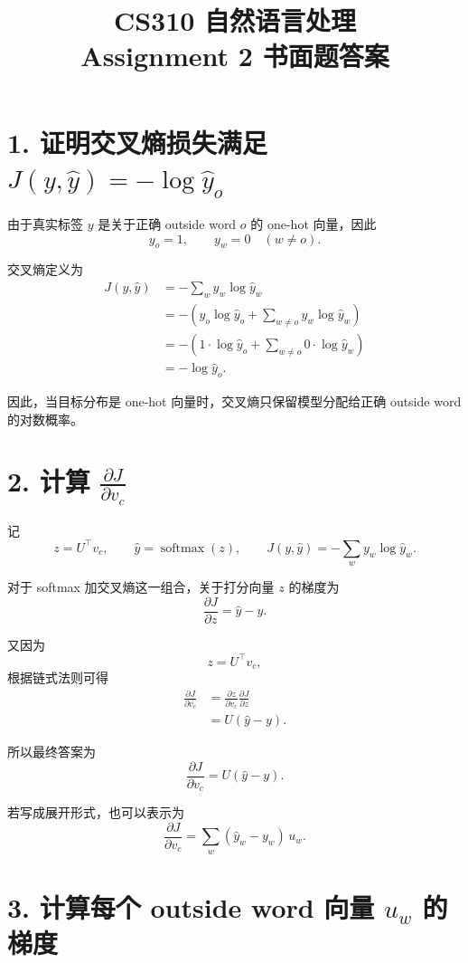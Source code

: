 \documentclass[11pt,a4paper]{ctexart}
\title{\vspace{-1.2cm}\textbf{CS310 自然语言处理}\\[3pt]\large Assignment 2 书面题答案\vspace{-0.4cm}}
\author{}
\date{}
\begin{document}
\maketitle
\thispagestyle{fancy}

\section*{1. 证明交叉熵损失满足 $J(y,\hat{y})=-\log \hat{y}_o$}

由于真实标签 $y$ 是关于正确 outside word $o$ 的 one-hot 向量，因此
\[
y_o = 1,\qquad y_w = 0 \quad (w \ne o).
\]

交叉熵定义为
\begin{align*}
J(y,\hat{y})
&= -\sum_{w} y_w \log \hat{y}_w \\
&= -\left(y_o \log \hat{y}_o + \sum_{w \ne o} y_w \log \hat{y}_w \right) \\
&= -\left(1 \cdot \log \hat{y}_o + \sum_{w \ne o} 0 \cdot \log \hat{y}_w \right) \\
&= -\log \hat{y}_o.
\end{align*}

因此，当目标分布是 one-hot 向量时，交叉熵只保留模型分配给正确 outside word 的对数概率。

\section*{2. 计算 $\frac{\partial J}{\partial v_c}$}

记
\[
z = U^\top v_c,\qquad \hat{y} = \operatorname{softmax}(z),\qquad
J(y,\hat{y}) = -\sum_w y_w \log \hat{y}_w.
\]

对于 softmax 加交叉熵这一组合，关于打分向量 $z$ 的梯度为
\[
\frac{\partial J}{\partial z} = \hat{y} - y.
\]

又因为
\[
z = U^\top v_c,
\]
根据链式法则可得
\begin{align*}
\frac{\partial J}{\partial v_c}
&= \frac{\partial z}{\partial v_c}\frac{\partial J}{\partial z} \\
&= U(\hat{y} - y).
\end{align*}

所以最终答案为
\[
\boxed{\frac{\partial J}{\partial v_c} = U(\hat{y} - y)}.
\]

若写成展开形式，也可以表示为
\[
\frac{\partial J}{\partial v_c} = \sum_w (\hat{y}_w - y_w)\,u_w.
\]

\section*{3. 计算每个 outside word 向量 $u_w$ 的梯度}
\end{document}
